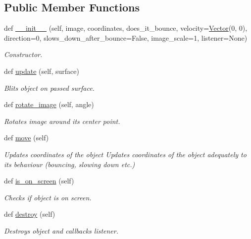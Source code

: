 \subsection*{Public Member Functions}
\begin{DoxyCompactItemize}
\item 
def \hyperlink{classMovingObject_1_1MovingObject_a237013581377a7e5f7163d47254dbce8}{\+\_\+\+\_\+init\+\_\+\+\_\+} (self, image, coordinates, does\+\_\+it\+\_\+bounce, velocity=\hyperlink{classVector_1_1Vector}{Vector}(0, 0), direction=0, slows\+\_\+down\+\_\+after\+\_\+bounce=False, image\+\_\+scale=1, listener=None)
\begin{DoxyCompactList}\small\item\em Constructor. \end{DoxyCompactList}\item 
def \hyperlink{classMovingObject_1_1MovingObject_ab8d51c9a7e120afad47200b6166d2530}{update} (self, surface)
\begin{DoxyCompactList}\small\item\em Blits object on passed surface. \end{DoxyCompactList}\item 
def \hyperlink{classMovingObject_1_1MovingObject_ac2299da57e4ff40983ed385c33ac4c63}{rotate\+\_\+image} (self, angle)
\begin{DoxyCompactList}\small\item\em Rotates image around it\textquotesingle{}s center point. \end{DoxyCompactList}\item 
def \hyperlink{classMovingObject_1_1MovingObject_a6060cd55441bc6f9473c4ad5520adc8c}{move} (self)\hypertarget{classMovingObject_1_1MovingObject_a6060cd55441bc6f9473c4ad5520adc8c}{}\label{classMovingObject_1_1MovingObject_a6060cd55441bc6f9473c4ad5520adc8c}

\begin{DoxyCompactList}\small\item\em Updates coordinates of the object Updates coordinates of the object adequately to it\textquotesingle{}s behaviour (bouncing, slowing down etc.) \end{DoxyCompactList}\item 
def \hyperlink{classMovingObject_1_1MovingObject_a3c44ea1a39ee9bd15bb16295a7f6bf75}{is\+\_\+on\+\_\+screen} (self)
\begin{DoxyCompactList}\small\item\em Checks if object is on screen. \end{DoxyCompactList}\item 
def \hyperlink{classMovingObject_1_1MovingObject_a7deae65ed90400dab791e8611e86c833}{destroy} (self)\hypertarget{classMovingObject_1_1MovingObject_a7deae65ed90400dab791e8611e86c833}{}\label{classMovingObject_1_1MovingObject_a7deae65ed90400dab791e8611e86c833}

\begin{DoxyCompactList}\small\item\em Destroys object and callbacks listener. \end{DoxyCompactList}\end{DoxyCompactItemize}


